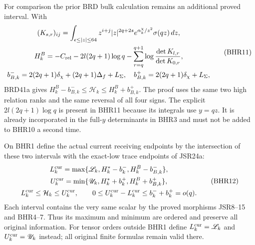 \documentclass[11pt,a4paper]{article}
\begin{document}
For comparison the prior BRD bulk calculation remains
an additional proved interval. With
\[
\begin{gathered}
 (K_{s,r})_{ij}=\int_{\epsilon\leq|z|\leq64}
 z^{i+j}|z|^{2q+2s}e^{\alpha_k^\chi/z^2}\sigma(qz)\,dz,\\
 H_k^B=-C_{\rm rel}-2l(2q+1)\log q
     -\sum_{r=q}^{q+1}\log\frac{\det K_{l,r}}{\det K_{0,r}},\\
 b_{B,k}^-=2(2q+1)\delta_\chi+(2q+1)\Delta_f+L_\Sigma,
 \quad b_{B,k}^+=2(2q+1)\delta_\chi+L_\Sigma,
\end{gathered}\tag{BHR11}
\]
BRD41a gives
$H_k^B-b_{B,k}^-\leq\mathcal H_k\leq H_k^B+b_{B,k}^+$.
The proof uses the same two high relation ranks and
the same reversal of all four signs. The explicit
$2l(2q+1)\log q$ is present in BHR11 because its
integrals use $y=qz$. It is already incorporated in
the full-$y$ determinants in BHR3 and must not be
added to BHR10 a second time.

On BHR1 define the actual current receiving endpoints
by the intersection of these two intervals with the
exact-low trace endpoints of JSR24a:
\[
\begin{gathered}
 L_k^{\rm cur}=\max\{\mathscr L_k,H_k^*-b_k^-,
                                      H_k^B-b_{B,k}^-\},\\
 U_k^{\rm cur}=\min\{\mathscr U_k,H_k^*+b_k^+,
                                      H_k^B+b_{B,k}^+\},\\
 L_k^{\rm cur}\leq\mathcal H_k\leq U_k^{\rm cur},
 \qquad0\leq U_k^{\rm cur}-L_k^{\rm cur}
                       \leq b_k^-+b_k^+=o(q).
\end{gathered}\tag{BHR12}
\]
Each interval contains the very same scalar by the
proved morphisms JSR8--15 and BHR4--7. Thus its maximum
and minimum are ordered and preserve all original
information. For tensor orders outside BHR1 define
$L_k^{\rm cur}=\mathscr L_k$ and
$U_k^{\rm cur}=\mathscr U_k$ instead; all original
finite formulas remain valid there.
\end{document}
